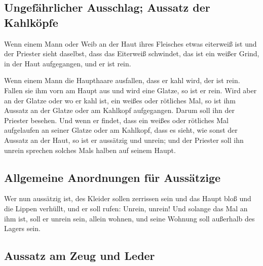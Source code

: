 \hypertarget{ungefuxe4hrlicher-ausschlag-aussatz-der-kahlkuxf6pfe}{%
\subsection{Ungefährlicher Ausschlag; Aussatz der
Kahlköpfe}\label{ungefuxe4hrlicher-ausschlag-aussatz-der-kahlkuxf6pfe}}

 Wenn einem Mann oder Weib an der Haut ihres Fleisches
etwas eiterweiß ist  und der Priester sieht daselbst,
dass das Eiterweiß schwindet, das ist ein weißer Grind, in der Haut
aufgegangen, und er ist rein.

 Wenn einem Mann die Haupthaare ausfallen, dass er kahl
wird, der ist rein.  Fallen sie ihm vorn am Haupt aus und
wird eine Glatze, so ist er rein.  Wird aber an der
Glatze oder wo er kahl ist, ein weißes oder rötliches Mal, so ist ihm
Aussatz an der Glatze oder am Kahlkopf aufgegangen. 
Darum soll ihn der Priester besehen. Und wenn er findet, dass ein weißes
oder rötliches Mal aufgelaufen an seiner Glatze oder am Kahlkopf, dass
es sieht, wie sonst der Aussatz an der Haut,  so ist er
aussätzig und unrein; und der Priester soll ihn unrein sprechen solches
Mals halben auf seinem Haupt.

\hypertarget{allgemeine-anordnungen-fuxfcr-aussuxe4tzige}{%
\subsection{Allgemeine Anordnungen für
Aussätzige}\label{allgemeine-anordnungen-fuxfcr-aussuxe4tzige}}

 Wer nun aussätzig ist, des Kleider sollen zerrissen sein
und das Haupt bloß und die Lippen verhüllt, und er soll rufen: Unrein,
unrein!  Und solange das Mal an ihm ist, soll er unrein
sein, allein wohnen, und seine Wohnung soll außerhalb des Lagers sein.

\hypertarget{aussatz-am-zeug-und-leder}{%
\subsection{Aussatz am Zeug und Leder}\label{aussatz-am-zeug-und-leder}}

